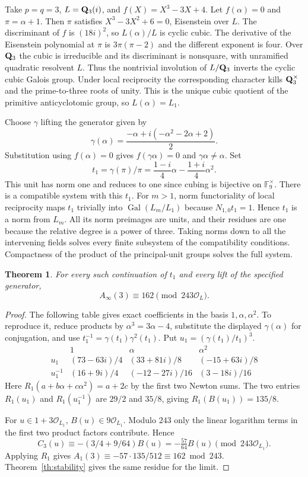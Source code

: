 \documentclass[11pt]{article}
\newtheorem{theorem}{Theorem}
\newcommand{\cO}{\mathcal O}
\begin{document}
Take $p=q=3$, $L=\mathbf Q_3(i)$, and $f(X)=X^3-3X+4$. Let $f(\alpha)=0$ and $\pi=\alpha+1$. Then $\pi$ satisfies $X^3-3X^2+6=0$, Eisenstein over $L$. The discriminant of $f$ is $(18i)^2$, so $L(\alpha)/L$ is cyclic cubic. The derivative of the Eisenstein polynomial at $\pi$ is $3\pi(\pi-2)$ and the different exponent is four. Over $\mathbf Q_3$ the cubic is irreducible and its discriminant is nonsquare, with unramified quadratic resolvent $L$. Thus the nontrivial involution of $L/\mathbf Q_3$ inverts the cyclic cubic Galois group. Under local reciprocity the corresponding character kills $\mathbf Q_3^\times$ and the prime-to-three roots of unity. This is the unique cubic quotient of the primitive anticyclotomic group, so $L(\alpha)=L_1$.

Choose $\gamma$ lifting the generator given by
\[
 \gamma(\alpha)=\frac{-\alpha+i(-\alpha^2-2\alpha+2)}2.
\]
Substitution using $f(\alpha)=0$ gives $f(\gamma\alpha)=0$ and $\gamma\alpha\ne\alpha$. Set
\[
 t_1=\gamma(\pi)/\pi=\frac{1-i}{4}\alpha-\frac{1+i}{4}\alpha^2 .
\]
This unit has norm one and reduces to one since cubing is bijective on $\mathbb F_9^\times$. There is a compatible system with this $t_1$. For $m>1$, norm functoriality of local reciprocity maps $t_1$ trivially into $\operatorname{Gal}(L_m/L_1)$ because $N_{1,0}t_1=1$. Hence $t_1$ is a norm from $L_m$. All its norm preimages are units, and their residues are one because the relative degree is a power of three. Taking norms down to all the intervening fields solves every finite subsystem of the compatibility conditions. Compactness of the product of the principal-unit groups solves the full system.

\begin{theorem}\label{th:example}
For every such continuation of $t_1$ and every lift of the specified generator,
\[
 A_\infty(3)\equiv 162\pmod {243\cO_L}.
\]
\end{theorem}
\begin{proof}
The following table gives exact coefficients in the basis $1,\alpha,\alpha^2$. To reproduce it, reduce products by $\alpha^3=3\alpha-4$, substitute the displayed $\gamma(\alpha)$ for conjugation, and use $t_1^{-1}=\gamma(t_1)\gamma^2(t_1)$. Put $u_1=(\gamma(t_1)/t_1)^3$.
\[
\begin{array}{c|ccc}
 &1&\alpha&\alpha^2\\ \hline
 u_1 &(73-63i)/4&(33+81i)/8&(-15+63i)/8\\
 u_1^{-1}&(16+9i)/4&(-12-27i)/16&(3-18i)/16
\end{array}
\]
Here $R_1(a+b\alpha+c\alpha^2)=a+2c$ by the first two Newton sums. The two entries $R_1(u_1)$ and $R_1(u_1^{-1})$ are $29/2$ and $35/8$, giving $R_1(B(u_1))=135/8$.

For $u\in1+3\cO_{L_1}$, $B(u)\in9\cO_{L_1}$. Modulo $243$ only the linear logarithm terms in the first two product factors contribute. Hence
\[
 C_3(u)\equiv-(3/4+9/64)B(u)=-\tfrac{57}{64}B(u)\pmod{243\cO_{L_1}} .
\]
Applying $R_1$ gives $A_1(3)\equiv-57\cdot135/512\equiv162\bmod243$. Theorem~\ref{th:stability} gives the same residue for the limit.
\end{proof}
\end{document}
